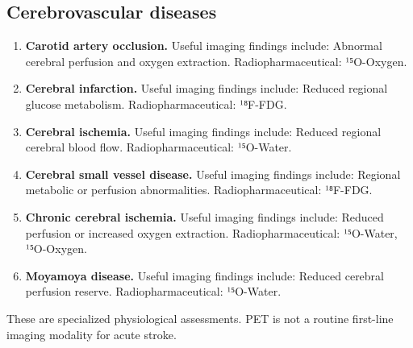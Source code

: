 \subsection{Cerebrovascular diseases}
\begin{enumerate}[leftmargin=*,itemsep=0.45em,topsep=0.4em]
\item \textbf{Carotid artery occlusion.} Useful imaging findings include: Abnormal cerebral perfusion and oxygen extraction. Radiopharmaceutical: ¹⁵O-Oxygen.
\item \textbf{Cerebral infarction.} Useful imaging findings include: Reduced regional glucose metabolism. Radiopharmaceutical: ¹⁸F-FDG.
\item \textbf{Cerebral ischemia.} Useful imaging findings include: Reduced regional cerebral blood flow. Radiopharmaceutical: ¹⁵O-Water.
\item \textbf{Cerebral small vessel disease.} Useful imaging findings include: Regional metabolic or perfusion abnormalities. Radiopharmaceutical: ¹⁸F-FDG.
\item \textbf{Chronic cerebral ischemia.} Useful imaging findings include: Reduced perfusion or increased oxygen extraction. Radiopharmaceutical: ¹⁵O-Water, ¹⁵O-Oxygen.
\item \textbf{Moyamoya disease.} Useful imaging findings include: Reduced cerebral perfusion reserve. Radiopharmaceutical: ¹⁵O-Water.
\end{enumerate}
These are specialized physiological assessments. PET is not a routine first-line imaging modality for acute stroke.

